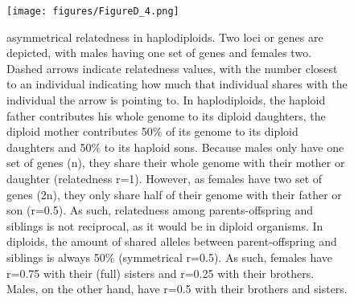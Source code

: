 \documentclass[10pt, twoside]{book} %
\begin{document}
	\begin{figure}[ht!]
		\begin{center}
			\texttt{[image: figures/FigureD\_4.png]}
		\end{center}
		\begin{footnotesize}
			\caption{asymmetrical relatedness in haplodiploids. Two loci or genes are depicted, with males having one set of genes and females two. Dashed arrows indicate relatedness values, with the number closest to an individual indicating how much that individual shares with the individual the arrow is pointing to. In haplodiploids, the haploid father contributes his whole genome to its diploid daughters, the diploid mother contributes 50$\%$ of its genome to its diploid daughters and 50$\%$ to its haploid sons. Because males only have one set of genes (n), they share their whole genome with their mother or daughter (relatedness r=1). However, as females have two set of genes (2n), they only share half of their genome with their father or son (r=0.5). As such, relatedness among parents-offspring and siblings is not reciprocal, as it would be in diploid organisms. In diploids, the amount of shared alleles between parent-offspring and siblings is always 50$\%$ (symmetrical r=0.5). As such, females have r=0.75 with their (full) sisters and r=0.25 with their brothers. Males, on the other hand, have r=0.5 with their brothers and sisters. \label{figD.4}}
		\end{footnotesize}
	\end{figure}
	
\end{document}
